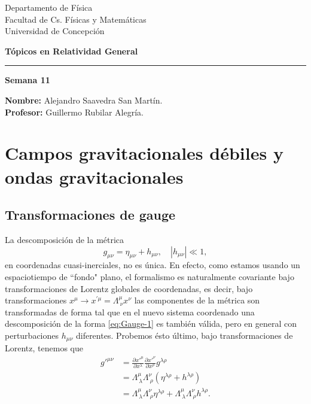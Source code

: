 \documentclass[letterpaper,11pt]{article}
\begin{document}
\pagestyle{plain}

\begin{flushleft}\vspace{-2cm}
Departamento de Física \\
Facultad de Cs. Físicas y Matemáticas\\
Universidad de Concepción
\end{flushleft}

\begin{flushright}\vspace{-1.5cm}
\textbf{Tópicos en Relatividad General} 
\end{flushright}



\rule{\linewidth}{0.1mm}

\begin{center}
\textbf{\LARGE Semana 11}
\end{center}

\begin{flushleft}
\textbf{Nombre:} Alejandro Saavedra San Martín. \\
\textbf{Profesor:} Guillermo Rubilar Alegría.
\end{flushleft}

\section{Campos gravitacionales débiles y ondas gravitacionales}

\subsection{Transformaciones de gauge}

La descomposición de la métrica 
\begin{equation}
g_{\mu\nu} = \eta_{\mu\nu} + h_{\mu\nu}, \quad |h_{\mu\nu}| \ll 1, \label{eq:Gauge-1}
\end{equation}
en coordenadas cuasi-inerciales, no es única. En efecto, como estamos usando un espaciotiempo de ``fondo" plano, el formalismo  es naturalmente covariante bajo transformaciones de Lorentz globales de coordenadas, es decir, bajo transformaciones $x^{\mu} \rightarrow x^{'\mu} = \Lambda^{\mu}_{\ \nu} x^{\nu}$ las componentes de la métrica son transformadas de forma tal que en el nuevo sistema coordenado una descomposición de la forma \eqref{eq:Gauge-1} es también válida, pero en general con perturbaciones $h_{\mu\nu}$ diferentes. Probemos ésto último, bajo transformaciones de Lorentz, tenemos que
\begin{align}
g'^{\mu\nu} &= \frac{\partial x'^{\mu}}{\partial x^{\lambda}} \frac{\partial x'^{\nu}}{\partial x^{\rho}} g^{\lambda\rho} \nonumber \\
&= \Lambda^{\mu}_{\ \lambda} \Lambda^{\nu}_{\ \rho} \left( \eta^{\lambda\rho}+ h^{\lambda\rho}\right) \nonumber \\
&= \Lambda^{\mu}_{\ \lambda} \Lambda^{\nu}_{\ \rho} \eta^{\lambda \rho} + \Lambda^{\mu}_{\ \lambda} \Lambda^{\nu}_{\ \rho} h^{\lambda\rho}.
\end{align}
\end{document}
